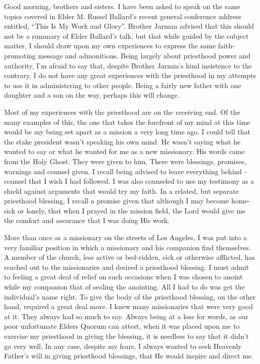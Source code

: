 \documentclass[12pt]{article}
\begin{document}
Good morning, brothers and sisters.  I have been asked to speak on the same topics
covered in Elder M. Russel Ballard's recent general conference address entitled,
``This Is My Work and Glory''.  Brother Jarman advised that this should not be a summary
of Elder Ballard's talk, but that while guided by the subject matter, I should draw
upon my own experiences to express the same faith-promoting message and admonitions.
Being largely about priesthood power and authority, I'm afraid to say that, despite
Brother Jarmin's kind insistence to the contrary, I do not have any great experiences with
the priesthood in my attempts to use it in administering to other people.  Being a fairly
new father with one daughter and a son on the way, perhaps this will change.

Most of my experiences with the priesthood are on the receiving end.  Of the many examples of
this, the one that takes the forefront of my mind at this time would be my being set apart as a
mission a very long time ago.  I could tell that the stake president wasn't speaking his own
mind.  He wasn't saying what he wanted to say or what he wanted for me as a new missionary.
His words came from the Holy Ghost.  They were given to him.  There were blessings, promises, warnings
and counsel given.  I recall being advised to leave everything behind -- counsel that I
wish I had followed.  I was also counseled to use my testimony as a shield against arguments
that would try my faith.  In a related, but separate priesthood blessing, I recall a promise given that
although I may become home-sick or lonely,
that when I prayed in the mission field, the Lord would give me the comfort and assurance that I was doing His work.

More than once as a missionary on the streets of Los Angeles, I was put into a
very familiar position in which a missionary and his companion find themselves.
A member of the church, less active or bed-ridden, sick or otherwise afflicted,
has reached out to the missionaries and desired a priesthood blessing.  I must admit
to feeling a great deal of relief on such occasions when I was chosen to anoint while
my companion that of sealing the anointing.  All I had to do was get the individual's name right.
To give the body of the priesthood blessing, on the other hand, required a great
deal more.  I knew many missionaries that were very good at it.  They always
had so much to say.  Always being at a loss for words, as our poor unfortunate
Elders Quorum can attest, when it was placed upon me to exercise my priesthood in
giving the blessing, it is needless to say that it didn't go very well.  In any case,
despite my fears, I always wanted to seek Heavenly Father's will in giving priesthood
blessings, that He would inspire and direct me.
\end{document}
